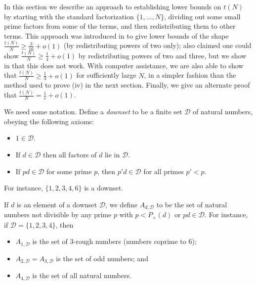 \documentclass[10pt,a4paper,reqno]{amsart}
\numberwithin{equation}{section}
\theoremstyle{plain}
\theoremstyle{definition}
\begin{document}
In this section we describe an approach to establishing lower bounds on $t(N)$ by starting with the standard factorization $\{1,\dots,N\}$, dividing out some small prime factors from some of the terms, and then redistributing them to other terms.  This approach was introduced in \cite{guy-selfridge} to give lower bounds of the shape $\frac{t(N)}{N} \geq \frac{3}{16} + o(1)$ (by redistributing powers of two only); \cite{guy-selfridge} also claimed one could show $\frac{t(N)}{N} \geq \frac{1}{4} + o(1)$ by redistributing powers of two and three, but we show in  that this does not work.  With computer assistance, we are also able to show that $\frac{t(N)}{N} \geq \frac{1}{3}+o(1)$ for sufficiently large $N$, in a simpler fashion than the method used to prove (iv) in the next section.  Finally, we give an alternate proof that $\frac{t(N)}{N} = \frac{1}{e}+o(1)$.

We need some notation.  Define a \emph{downset} to be a finite set ${\mathcal D}$ of natural numbers, obeying the following axioms:
\begin{itemize}
  \item $1 \in {\mathcal D}$.
  \item If $d \in {\mathcal D}$ then all factors of $d$ lie in ${\mathcal D}$.
  \item If $pd \in {\mathcal D}$ for some prime $p$, then $p'd \in {\mathcal D}$ for all primes $p'<p$.
\end{itemize}
For instance, $\{1,2,3,4,6\}$ is a downset.

If $d$ is an element of a downset ${\mathcal D}$, we define $A_{d,\mathcal{D}}$ to be the set of natural numbers not divisible by any prime $p$ with $p < P_+(d)$ or $pd \in \mathcal{D}$.  For instance, if ${\mathcal D} = \{1,2,3,4\}$, then
\begin{itemize}
\item $A_{1,{\mathcal D}}$ is the set of $3$-rough numbers (numbers coprime to $6$);
\item $A_{2,{\mathcal D}} = A_{3,{\mathcal D}}$ is the set of odd numbers; and
\item $A_{4,{\mathcal D}}$ is the set of all natural numbers.
\end{itemize}
\end{document}
